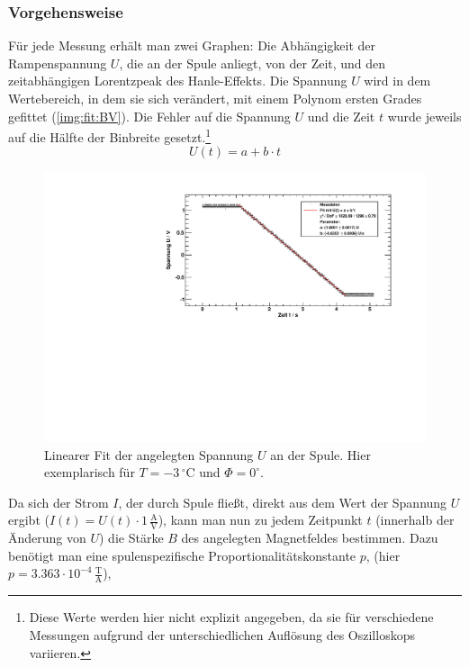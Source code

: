 \subsubsection{Vorgehensweise}
Für jede Messung erhält man zwei Graphen: Die Abhängigkeit der Rampenspannung $U$, die an der Spule anliegt, von der Zeit, und den 
zeitabhängigen Lorentzpeak des Hanle-Effekts. Die Spannung $U$ wird in dem Wertebereich, in dem sie sich verändert, mit 
einem Polynom ersten Grades gefittet (\autoref{img:fit:BV}). Die Fehler auf die Spannung $U$ und die Zeit $t$ wurde jeweils auf die Hälfte der 
Binbreite gesetzt.\footnote{Diese Werte werden hier nicht explizit angegeben, da sie für verschiedene Messungen aufgrund der unterschiedlichen 
Auflösung des Oszilloskops variieren.}
\begin{equation}
  \label{eq:BV:fitfunction}
  U(t) = a + b \cdot t
\end{equation}
\begin{figure}[H]
\begin{center}
  \includegraphics[width=\textwidth]{../img/fitBV_00_m03.pdf}
  \caption{Linearer Fit der angelegten Spannung $U$ an der Spule. Hier exemplarisch für $T=-3\,{}^\circ$C und $\Phi=0^\circ$.}
  \label{img:fit:BV}
\end{center}
\end{figure}
Da sich der Strom $I$, der durch Spule fließt, direkt aus dem Wert der Spannung $U$ ergibt ($I(t) = U(t) \cdot 1\,\frac{\text{A}}{\text{V}}$), kann man nun zu 
jedem Zeitpunkt $t$ (innerhalb der Änderung von $U$) die Stärke $B$ des angelegten Magnetfeldes bestimmen. Dazu benötigt man eine spulenspezifische 
Proportionalitätskonstante $p$, (hier $p=3.363\cdot10^{-4}\,\frac{\text{T}}{\text{A}}$), 
